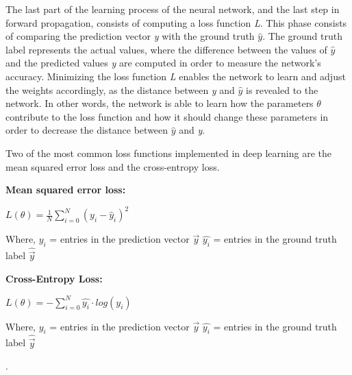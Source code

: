 \indent\newline 
The last part of the learning process of the neural network, and the last step in forward propagation, consists of computing a loss function \textit{L}. This phase consists of comparing the prediction vector \textit{y} with the ground truth $\widehat{y}$. The ground truth label represents the actual values, where the difference between the values of $\widehat{y}$ and the predicted values \textit{y} are computed in order to measure the network's accuracy. Minimizing the loss function \textit{L} enables the network to learn and adjust the weights accordingly, as the distance between \textit{y} and $\widehat{y}$ is revealed to the  network. In other words, the network is able to learn how the parameters $\theta$ contribute to the loss function and how it should change these parameters in order to decrease the distance between $\widehat{y}$ and \textit{y}.

\indent\newline 
Two of the most common loss functions implemented in deep learning are the mean squared error loss and the cross-entropy loss. 

\indent\newline 
\textbf{Mean squared error loss:}

\indent\newline 
$L(\theta) = \frac{1}{N} \sum_{i=0}^{N} (y_{i} - \widehat{y}_{i})^{2}$

\indent\newline 
Where,
\indent\newline 
$y_{i}$ = entries in the prediction vector $\overrightarrow{y}$
\indent\newline 
$\widehat{y_{i}}$ = entries in the ground truth label $\widehat{\overrightarrow{y}}$

\indent\newline 
\textbf{Cross-Entropy Loss:}

\indent\newline 
$L(\theta) = - \sum_{i=0}^{N} \widehat{y_{i}} \cdot log(y_{i})$

\indent\newline 
Where,
\indent\newline 
$y_{i}$ = entries in the prediction vector $\overrightarrow{y}$
\indent\newline 
$\widehat{y_{i}}$ = entries in the ground truth label $\widehat{\overrightarrow{y}}$

\indent\newline 
\cite{opper}.

